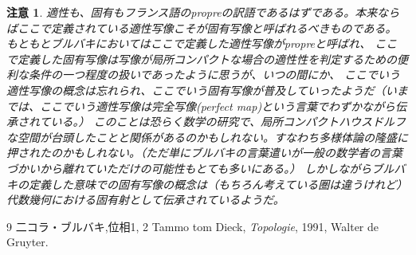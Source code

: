\documentclass[leqno]{jsarticle}
\newtheorem*{cau}{注意}
\begin{document}
\begin{cau}
適性も、固有もフランス語のpropreの訳語であるはずである。本来ならばここで定義されている適性写像こそが固有写像と呼ばれるべきものである。
もともとブルバキにおいてはここで定義した適性写像がpropreと呼ばれ、
ここで定義した固有写像は写像が局所コンパクトな場合の適性性を判定するための便利な条件の一つ程度の扱いであったように思うが、いつの間にか、
ここでいう適性写像の概念は忘れられ、ここでいう固有写像が普及していったようだ（いまでは、ここでいう適性写像は完全写像(perfect map)という言葉でわずかながら伝承されている。）
このことは恐らく数学の研究で、局所コンパクトハウスドルフな空間が台頭したことと関係があるのかもしれない。すなわち多様体論の隆盛に押されたのかもしれない。（ただ単にブルバキの言葉遣いが一般の数学者の言葉づかいから離れていただけの可能性もとても多いにある。）
しかしながらブルバキの定義した意味での固有写像の概念は（もちろん考えている圏は違うけれど）代数幾何における固有射として伝承されているようだ。
\end{cau}


	
\begin{thebibliography}{9}
 二コラ・ブルバキ,位相1, 2
 Tammo tom Dieck, \textit{Topologie}, 1991, Walter de Gruyter. 
\end{thebibliography}




			
\end{document}
